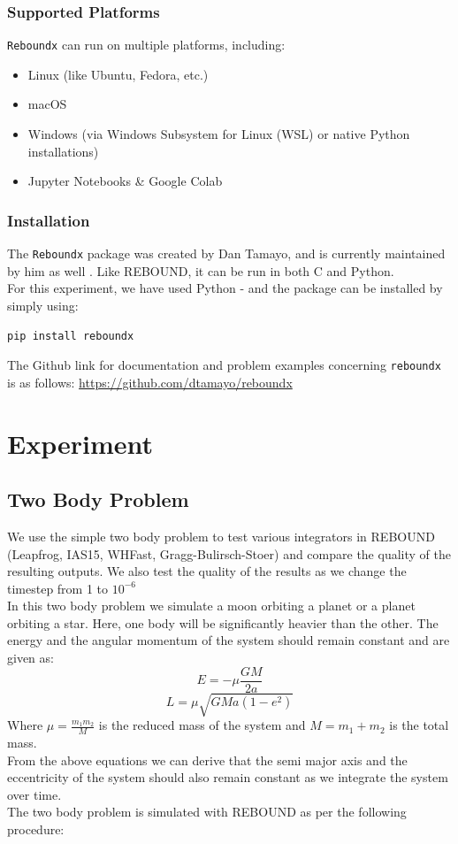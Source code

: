 \documentclass[12pt,a4paper]{article}
\begin{document}
\subsubsection{Supported Platforms}
\texttt{Reboundx} can run on multiple platforms, including:
\begin{itemize}
    \item Linux (like Ubuntu, Fedora, etc.)
    \item macOS
    \item Windows (via Windows Subsystem for Linux (WSL) or native Python installations)
    \item Jupyter Notebooks \& Google Colab
\end{itemize}
\subsubsection{Installation}
The \texttt{Reboundx} package was created by Dan Tamayo, and is currently maintained by him as well \cite{Tamayo_2019}. Like REBOUND, it can be run in both C and Python. \\
For this experiment, we have used Python - and the package can be installed by simply using:
\begin{verbatim}
pip install reboundx
\end{verbatim}
The Github link for documentation and problem examples concerning \texttt{reboundx} is as follows: \href{https://github.com/dtamayo/reboundx}{https://github.com/dtamayo/reboundx}

\section{Experiment}
\subsection{Two Body Problem}
We use the simple two body problem to test various integrators in REBOUND (Leapfrog, IAS15, WHFast, Gragg-Bulirsch-Stoer) and compare the quality of the resulting outputs.
We also test the quality of the results as we change the timestep from 1 to $10^{-6}$\\
In this two body problem we simulate a moon orbiting a planet or a planet orbiting a star. Here, one body will be significantly heavier than the other. 
The energy and the angular momentum of the system should remain constant and are given as: 
\begin{equation}
   E = -\mu \frac{GM}{2a}
\end{equation}
\begin{equation}
  L = \mu \sqrt{GMa(1-e^2)}
\end{equation}
Where $\mu = \frac{m_1m_2}{M}$ is the reduced mass of the system and $M=m_1+m_2$ is the total mass.\\
From the above equations we can derive that the semi major axis and the eccentricity of the system should also remain constant as we integrate the system over time.\\
The two body problem is simulated with REBOUND as per the following procedure:
\end{document}
